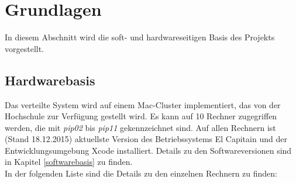 \section{Grundlagen}
\label{Voraussetzungen}
In diesem Abschnitt wird die soft- und hardwareseitigen Basis des Projekts vorgestellt. 
\subsection{Hardwarebasis}
Das verteilte System wird auf einem Mac-Cluster implementiert, das von der Hochschule zur Verfügung gestellt wird. Es kann auf 10 Rechner zugegriffen werden, die mit \emph{pip02} bis \emph{pip11} gekennzeichnet sind. Auf allen Rechnern ist (Stand 18.12.2015) aktuellste Version des Betriebssystems El Capitain und der Entwicklungsumgebung Xcode installiert. Details zu den Softwareversionen sind in Kapitel \ref{softwarebasis} zu finden. \\
In der folgenden Liste sind die Details zu den einzelnen Rechnern zu finden:

